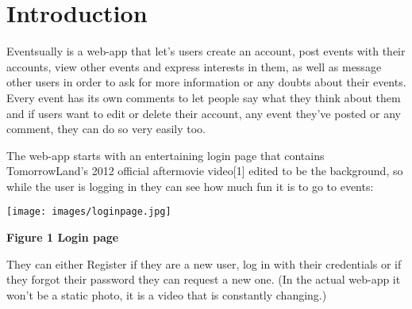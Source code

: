 \documentclass[10pt, a4paper]{article}
\title{\mytitle}
\author{\myauthor\hspace{1em}\\\contact\\Edinburgh Napier University\hspace{0.5em}-\hspace{0.5em}\mymodule}
\date{}
\begin{document}
	\maketitle
	\begin{abstract}

The aim of this coursework is to demonstrate my understanding of server-side web development and mastery of the Python Flask micro-framework by completing a personal project in which I design, implement and evaluate a web application of my choice.

My web application is called 'Eventsually' and it is an events web app. An events webpage is important because socialising reduces stress, combats loneliness and promotes people's self esteem.  There will be a higher user engagement in the events if the web page looks appealing to them and this will give people the chance to leave their houses and socialise. Dynamic designs and responsive layouts make the internet a thing of beauty.

	\end{abstract}

	\section{Introduction}

Eventsually is a web-app that let's users create an account, post events with their accounts, view other events and express interests in them, as well as message other users in order to ask for more information or any doubts about their events. Every event has its own comments to let people say what they think about them and if users want to edit or delete their account, any event they've posted or any comment, they can do so very easily too.

The web-app starts with an entertaining login page that contains TomorrowLand's 2012 official aftermovie video[1] edited to be the background, so while the user is logging in they can see how much fun it is to go to events:

    \texttt{[image: images/loginpage.jpg]}

    \textbf{Figure 1 Login page}
    \vspace{2mm}

They can either Register if they are a new user, log in with their credentials or if they forgot their password they can request a new one. (In the actual web-app it won't be a static photo, it is a video that is constantly changing.)
\end{document}
